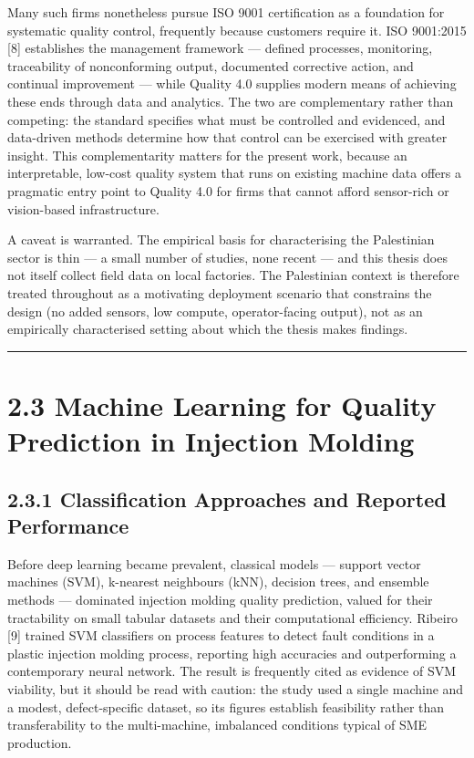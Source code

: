 Many such firms nonetheless pursue ISO 9001 certification as a foundation for systematic quality control, frequently because customers require it. ISO 9001:2015 {[}8{]} establishes the management framework --- defined processes, monitoring, traceability of nonconforming output, documented corrective action, and continual improvement --- while Quality 4.0 supplies modern means of achieving these ends through data and analytics. The two are complementary rather than competing: the standard specifies what must be controlled and evidenced, and data-driven methods determine how that control can be exercised with greater insight. This complementarity matters for the present work, because an interpretable, low-cost quality system that runs on existing machine data offers a pragmatic entry point to Quality 4.0 for firms that cannot afford sensor-rich or vision-based infrastructure.

A caveat is warranted. The empirical basis for characterising the Palestinian sector is thin --- a small number of studies, none recent --- and this thesis does not itself collect field data on local factories. The Palestinian context is therefore treated throughout as a motivating deployment scenario that constrains the design (no added sensors, low compute, operator-facing output), not as an empirically characterised setting about which the thesis makes findings.

\begin{center}\rule{0.5\linewidth}{0.5pt}\end{center}

\hypertarget{machine-learning-for-quality-prediction-in-injection-molding}{%
\section{2.3 Machine Learning for Quality Prediction in Injection Molding}\label{machine-learning-for-quality-prediction-in-injection-molding}}

\hypertarget{classification-approaches-and-reported-performance}{%
\subsection{2.3.1 Classification Approaches and Reported Performance}\label{classification-approaches-and-reported-performance}}

Before deep learning became prevalent, classical models --- support vector machines (SVM), k-nearest neighbours (kNN), decision trees, and ensemble methods --- dominated injection molding quality prediction, valued for their tractability on small tabular datasets and their computational efficiency. Ribeiro {[}9{]} trained SVM classifiers on process features to detect fault conditions in a plastic injection molding process, reporting high accuracies and outperforming a contemporary neural network. The result is frequently cited as evidence of SVM viability, but it should be read with caution: the study used a single machine and a modest, defect-specific dataset, so its figures establish feasibility rather than transferability to the multi-machine, imbalanced conditions typical of SME production.

